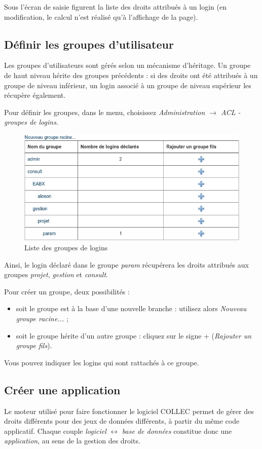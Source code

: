 Sous l'écran de saisie figurent la liste des droits attribués à un login (en modification, le calcul n'est réalisé qu'à l'affichage de la page).

\subsection{Définir les groupes d'utilisateur}

Les groupes d'utilisateurs sont gérés selon un mécanisme d'héritage. Un groupe de haut niveau hérite des groupes précédents : si des droits ont été attribués à un groupe de niveau inférieur, un login associé à un groupe de niveau supérieur les récupère également.

Pour définir les groupes, dans le menu, choisissez \textit{Administration $\rightarrow$ ACL - groupes de logins}.

\begin{figure}[H]
\includegraphics[width=\linewidth]{images/acl_groupe}
\caption{Liste des groupes de logins}
\end{figure}

Ainsi, le login déclaré dans le groupe \textit{param} récupérera les droits attribués aux groupes \textit{projet}, \textit{gestion} et \textit{consult}.

Pour créer un groupe, deux possibilités :
\begin{itemize}
\item soit le groupe est à la base d'une nouvelle branche : utilisez alors \textit{Nouveau groupe racine...} ;
\item soit le groupe hérite d'un autre groupe : cliquez sur le signe + (\textit{Rajouter un groupe fils}).
\end{itemize}

Vous pouvez indiquer les logins qui sont rattachés à ce groupe.


\subsection{Créer une application}
Le moteur utilisé pour faire fonctionner le logiciel COLLEC permet de gérer des droits différents pour des jeux de données différents, à partir du même code applicatif. Chaque couple \textit{logiciel} $\leftrightarrow$ \textit{base de données} constitue donc une \textit{application}, au sens de la gestion des droits.

